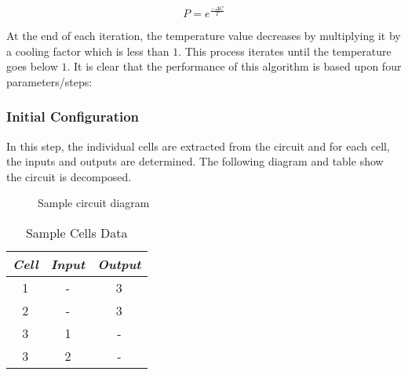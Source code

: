 \documentclass[conference]{IEEEtran}
\newcommand\T{\rule{0pt}{2.6ex}}       %
\newcommand\B{\rule[-1.2ex]{0pt}{0pt}} %
\begin{document}
    \begin{equation}
        P = e^{\frac{-\Delta C}{T}}
    \end{equation}

At the end of each iteration, the temperature value decreases by multiplying it by a cooling factor which is less than $1$. This process iterates until the temperature goes below $1$. It is clear that the performance of this algorithm is based upon four parameters\slash steps:

\subsubsection{Initial Configuration}
In this step, the individual cells are extracted from the circuit and for each cell, the inputs and outputs are determined. The following diagram and table show the circuit is decomposed.
\begin{figure}[!h]
    \centering
    \caption{Sample circuit diagram}
\end{figure}

\begin{table}[H]
    \caption{Sample Cells Data}
    \centering
     \begin{tabular}{||c c c||} 
     \hline
     \textit{\textbf{Cell}} & \textit{\textbf{Input}} & \textit{\textbf{Output}} \T \B \\ 
     \hline
     \hline
     1 & - & 3 \T \B \\ 
     \hline
     2 & - & 3 \T \B \\
     \hline
     3 & 1 & - \T \B \\
     \hline
     3 & 2 & - \T \B \\
     \hline
     \end{tabular}
     \label{table1}
\end{table}
\end{document}
